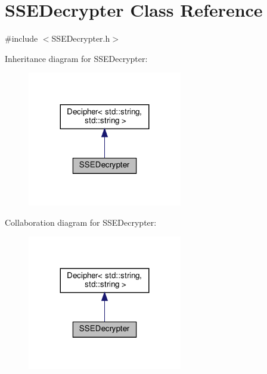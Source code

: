 \hypertarget{classSSEDecrypter}{}\section{S\+S\+E\+Decrypter Class Reference}
\label{classSSEDecrypter}


{\ttfamily \#include $<$S\+S\+E\+Decrypter.\+h$>$}



Inheritance diagram for S\+S\+E\+Decrypter\+:
\nopagebreak
\begin{figure}[H]
\begin{center}
\leavevmode
\includegraphics[width=191pt]{classSSEDecrypter__inherit__graph}
\end{center}
\end{figure}


Collaboration diagram for S\+S\+E\+Decrypter\+:
\nopagebreak
\begin{figure}[H]
\begin{center}
\leavevmode
\includegraphics[width=191pt]{classSSEDecrypter__coll__graph}
\end{center}
\end{figure}
